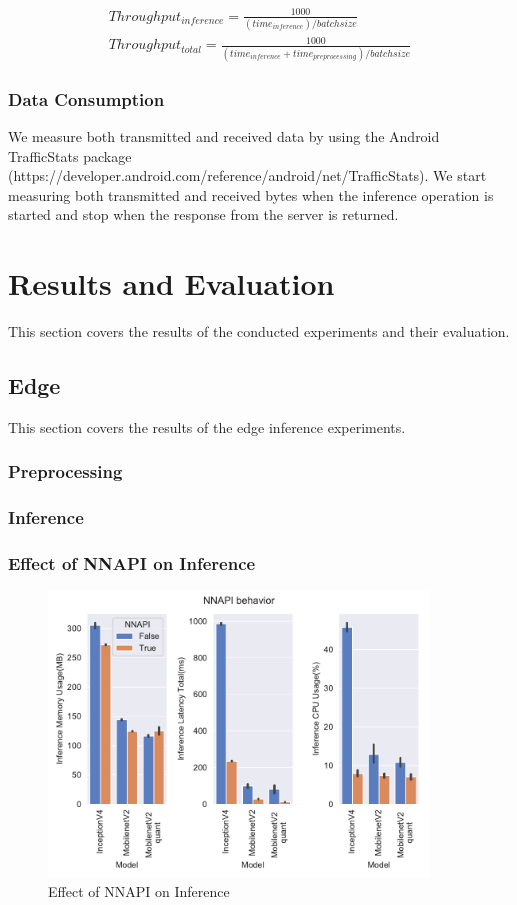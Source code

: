 \begin{equation*}
\begin{gathered}
Throughput_{inference} =\frac{1000}{(time_{inference}) / batchsize}\\
Throughput_{total}  =\frac{1000}{(time_{inference} + time_{preprocessing}) / batchsize}
\end{gathered}
\end{equation*}
\subsubsection{Data Consumption}
We measure both transmitted and received data by using the Android TrafficStats package (https://developer.android.com/reference/android/net/TrafficStats). We start measuring both transmitted and received bytes when the inference operation is started and stop when the response from the server is returned. 
\section{Results and Evaluation}
This section covers the results of the conducted experiments and their evaluation.
\subsection{Edge}
This section covers the results of the edge inference experiments.
\subsubsection{Preprocessing}
\subsubsection{Inference}
\subsubsection{Effect of NNAPI on Inference}
\begin{figure}[H]
\centering
\includegraphics[width=0.9\textwidth]{./Bilder/single_plots/edge_inference_plots/NNAPI_behavior.pdf}
\caption{Effect of NNAPI on Inference}
\label{fig:NNAPI}
\end{figure}
